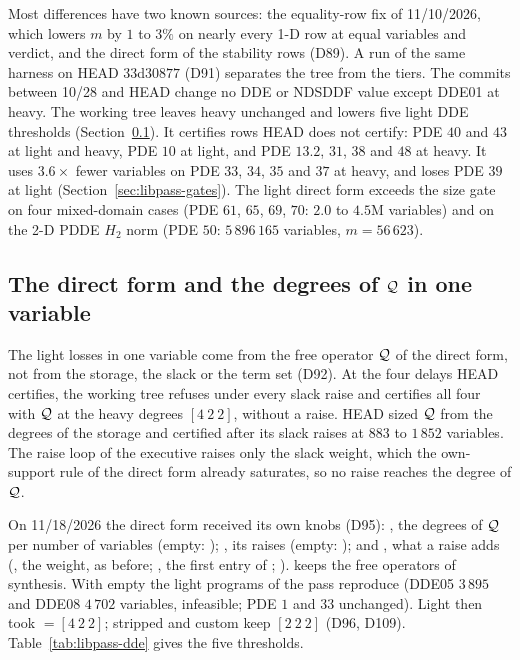 Most differences have two known sources: the equality-row fix of 11/10/2026, which lowers $m$ by $1$ to $3\%$ on nearly every 1-D row at equal variables and verdict, and the direct form  of the stability rows (D89). A run of the same harness on HEAD $33$d$30877$ (D91) separates the tree from the tiers. The commits between 10/28 and HEAD change no DDE or NDSDDF value except DDE01 at heavy. The working tree leaves heavy unchanged and lowers five light DDE thresholds (Section~\ref{sec:libpass-q1}). It certifies rows HEAD does not certify: PDE $40$ and $43$ at light and heavy, PDE $10$ at light, and PDE $13.2$, $31$, $38$ and $48$ at heavy. It uses $3.6\times$ fewer variables on PDE $33$, $34$, $35$ and $37$ at heavy, and loses PDE $39$ at light (Section~\ref{sec:libpass-gates}). The light direct form exceeds the size gate on four mixed-domain cases (PDE $61$, $65$, $69$, $70$: $2.0$ to $4.5$M variables) and on the 2-D PDDE $H_2$ norm (PDE $50$: $5\,896\,165$ variables, $m=56\,623$).

\subsection{The direct form and the degrees of $\mathcal{Q}$ in one variable}\label{sec:libpass-q1}

The light losses in one variable come from the free operator $\mathcal{Q}$ of the direct form, not from the storage, the slack or the term set (D92). At the four delays HEAD certifies, the working tree refuses under every slack raise and certifies all four with $\mathcal{Q}$ at the heavy degrees $[4\ 2\ 2]$, without a raise. HEAD sized $\mathcal{Q}$ from the degrees of the storage and certified after its slack raises at $883$ to $1\,852$ variables. The raise loop of the executive raises only the slack weight, which the own-support rule of the direct form already saturates, so no raise reaches the degree of $\mathcal{Q}$.

On 11/18/2026 the direct form received its own knobs (D95): , the degrees of $\mathcal{Q}$ per number of variables (empty: ); , its raises (empty: ); and , what a raise adds (, the weight, as before; , the first entry of ; ).  keeps the free operators of synthesis. With  empty the light programs of the pass reproduce (DDE05 $3\,895$ and DDE08 $4\,702$ variables, infeasible; PDE $1$ and $33$ unchanged). Light then took  $=[4\ 2\ 2]$; stripped and custom keep $[2\ 2\ 2]$ (D96, D109). Table~\ref{tab:libpass-dde} gives the five thresholds.

